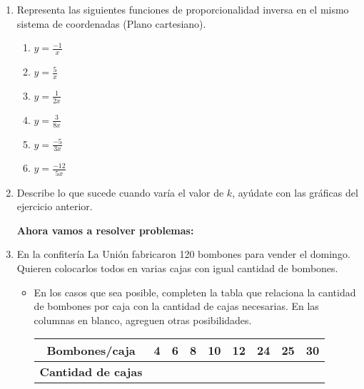 \documentclass[12pt,a4paper]{article}
\begin{document}
\begin{enumerate}
\item Representa las siguientes funciones de proporcionalidad inversa en el mismo sistema de coordenadas (Plano cartesiano).

\begin{enumerate}[label=\alph*.]
\item $y = \frac{-1}{x}$ 

\vspace{3.5mm}

\item $y = \frac{5}{x}$

\vspace{3.5mm}

\item $y = \frac{1}{2x}$

\vspace{3.5mm}

\item $y = \frac{3}{8x}$

\vspace{3.5mm}

\item $y = \frac{-5}{3x}$

\vspace{3.5mm}

\item $y = \frac{-12}{5x}$

\vspace{3.5mm}

\end{enumerate}

\item Describe lo que sucede cuando varía el valor de $k$, ayúdate con las gráficas del ejercicio anterior.

\textbf{Ahora vamos a resolver problemas:}

\item En la confitería La Unión fabricaron 120 bombones para vender el domingo. Quieren colocarlos todos en varias cajas con igual cantidad de bombones.

\begin{itemize}
\item En los casos que sea posible, completen la tabla que relaciona la cantidad de bombones por caja con la cantidad de cajas necesarias. En las columnas en blanco, agreguen otras posibilidades.

\vspace{3.5mm}

\begin{center}
\small
\begin{tabular}{|c|c|c|c|c|c|c|c|c|}
\hline
\textbf{Bombones/caja} & 4 & 6 & 8 & 10 & 12 & 24 & 25 & 30 \\
\hline
\textbf{Cantidad de cajas} & & & & & & & & \\
\hline
\end{tabular}
\end{center}


\end{itemize}
\end{enumerate}
\end{document}
